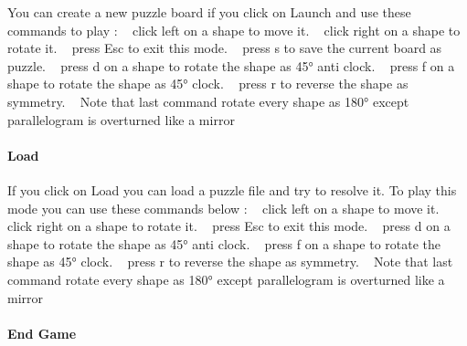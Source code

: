 You can create a new puzzle board if you click on {\ttfamily Launch} and use these commands to play \+: ~\newline
 {\ttfamily click left} on a shape to move it. ~\newline
 {\ttfamily click right} on a shape to rotate it. ~\newline
 {\ttfamily press \textquotesingle{}Esc\textquotesingle{}} to exit this mode. ~\newline
 {\ttfamily press \textquotesingle{}s\textquotesingle{}} to save the current board as puzzle. ~\newline
 {\ttfamily press \textquotesingle{}d\textquotesingle{}} on a shape to rotate the shape as 45° anti clock. ~\newline
 {\ttfamily press \textquotesingle{}f} on a shape to rotate the shape as 45° clock. ~\newline
 {\ttfamily press \textquotesingle{}r\textquotesingle{}} to reverse the shape as symmetry. ~\newline
 Note that last command rotate every shape as 180° except parallelogram is overturned like a mirror ~\newline
 ~\newline
 \paragraph*{Load}

If you click on {\ttfamily Load} you can load a puzzle file and try to resolve it. To play this mode you can use these commands below \+: ~\newline
 {\ttfamily click left} on a shape to move it. ~\newline
 {\ttfamily click right} on a shape to rotate it. ~\newline
 {\ttfamily press \textquotesingle{}Esc\textquotesingle{}} to exit this mode. ~\newline
 {\ttfamily press \textquotesingle{}d\textquotesingle{}} on a shape to rotate the shape as 45° anti clock. ~\newline
 {\ttfamily press \textquotesingle{}f} on a shape to rotate the shape as 45° clock. ~\newline
 {\ttfamily press \textquotesingle{}r\textquotesingle{}} to reverse the shape as symmetry. ~\newline
 Note that last command rotate every shape as 180° except parallelogram is overturned like a mirror ~\newline
 \paragraph*{End Game}

